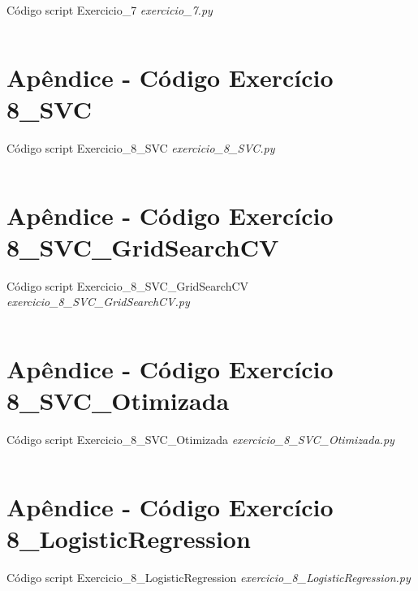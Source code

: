 Código script Exercicio\_7 \textit{exercicio\_7.py}

\inputminted[linenos,framesep=1mm, baselinestretch=0.8,]{python}{Apendices/exercicio_7.py}



\renewcommand{\leftmark}{Apêndice - Código Exercício 8\_SVC}
\section*{Apêndice - Código Exercício 8\_SVC} \label{Apêndice - Código Exercício 8 SVC}

Código script Exercicio\_8\_SVC \textit{exercicio\_8\_SVC.py}

\inputminted[linenos,framesep=1mm, baselinestretch=0.8,]{python}{Apendices/exercicio_8_SVC.py}



\renewcommand{\leftmark}{Apêndice - Código Exercício 8\_SVC\_GridSearchCV}
\section*{Apêndice - Código Exercício 8\_SVC\_GridSearchCV} \label{Apêndice - Código Exercício 8 SVC GridSearchCV}

Código script Exercicio\_8\_SVC\_GridSearchCV \textit{exercicio\_8\_SVC\_GridSearchCV.py}

\inputminted[linenos,framesep=1mm, baselinestretch=0.8,]{python}{Apendices/exercicio_8_SVC_GridSearchCV.py}



\renewcommand{\leftmark}{Apêndice - Código Exercício 8\_SVC\_Otimizada}
\section*{Apêndice - Código Exercício 8\_SVC\_Otimizada} \label{Apêndice - Código Exercício 8 SVC Otimizada}

Código script Exercicio\_8\_SVC\_Otimizada \textit{exercicio\_8\_SVC\_Otimizada.py}

\inputminted[linenos,framesep=1mm, baselinestretch=0.8,]{python}{Apendices/exercicio_8_SVC_Otimizada.py}



\renewcommand{\leftmark}{Apêndice - Código Exercício 8\_LogisticRegression}
\section*{Apêndice - Código Exercício 8\_LogisticRegression} \label{Apêndice - Código Exercício 8 LogisticRegression}

Código script Exercicio\_8\_LogisticRegression \textit{exercicio\_8\_LogisticRegression.py}

\inputminted[linenos,framesep=1mm, baselinestretch=0.8,]{python}{Apendices/exercicio_8_LogisticRegression.py}